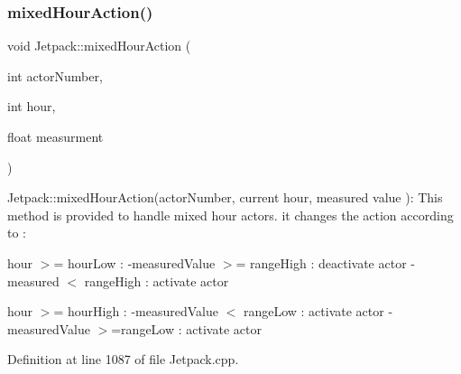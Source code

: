 \subsubsection{\texorpdfstring{mixed\+Hour\+Action()}{mixedHourAction()}}
{\footnotesize\ttfamily void Jetpack\+::mixed\+Hour\+Action (\begin{DoxyParamCaption}\item[{int}]{actor\+Number,  }\item[{int}]{hour,  }\item[{float}]{measurment }\end{DoxyParamCaption})}

Jetpack\+::mixed\+Hour\+Action(actor\+Number, current hour, measured value )\+: This method is provided to handle mixed hour actors. it changes the action according to \+:

hour $>$= hour\+Low \+: -\/measured\+Value $>$= range\+High \+: deactivate actor -\/measured $<$ range\+High \+: activate actor

hour $>$= hour\+High \+: -\/measured\+Value $<$ range\+Low \+: activate actor -\/measured\+Value $>$=range\+Low \+: activate actor 

Definition at line 1087 of file Jetpack.\+cpp.


